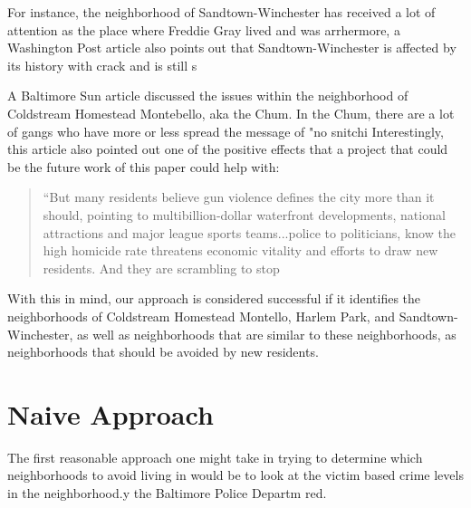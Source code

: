 \documentclass[conference]{IEEEtran}
\begin{document}
For instance, the neighborhood of Sandtown-Winchester has received a lot of attention as the place where Freddie Gray lived
and was arrhermore, a Washington Post article also points
out that Sandtown-Winchester is affected by its history with crack and is still s

A Baltimore Sun article discussed the issues within the neighborhood of Coldstream Homestead Montebello, aka the Chum.
In the Chum, there are a lot of gangs who have more or less spread the message of "no snitchi
Interestingly, this article also pointed out one of the positive effects that a project that could be the future work
 of this paper could help with:

\begin{quote}
``But many residents believe gun violence defines the city more than it should, pointing to multibillion-dollar waterfront
developments, national attractions and major league sports teams...police to politicians, know the high homicide rate
threatens economic vitality and efforts to draw new residents. And they are scrambling to stop
\end{quote}

With this in mind, our approach is considered successful if it identifies the neighborhoods of Coldstream Homestead Montello,
Harlem Park, and Sandtown-Winchester, as well as neighborhoods that are similar to these neighborhoods,
 as neighborhoods that should be avoided by new residents.

\section {Naive Approach}
The first reasonable approach one might take in trying to determine which neighborhoods to avoid living in would be to look at
the victim based crime levels in the neighborhood.y the Baltimore Police Departm red.

\end{document}
